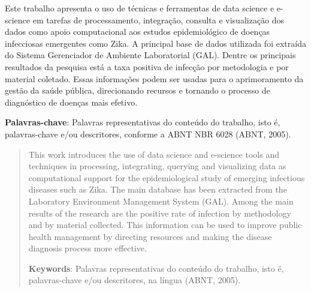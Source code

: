 \begin{resumo}

Este trabalho apresenta o uso de técnicas e ferramentas de data science e e-science em tarefas de processamento, integração, consulta e visualização dos dados como apoio computacional aos estudos epidemiológico de doenças infecciosas emergentes como Zika. A principal base de dados utilizada foi extraída do Sistema Gerenciador de Ambiente Laboratorial (GAL). Dentre os principais resultados da pesquisa está a taxa positiva de infecção por metodologia e por material coletado. Essas informações podem ser usadas para o aprimoramento da gestão da saúde pública, direcionando recursos e tornando o processo de diagnóstico de doenças mais efetivo.

{\hspace{-8mm} \bf{Palavras-chave}}: Palavras representativas do conteúdo do trabalho, isto é, palavras-chave e/ou descritores, conforme a ABNT NBR 6028 (ABNT, 2005).

\end{resumo}

\begin{abstract}

This work introduces the use of data science and e-science tools and techniques in processing, integrating, querying and visualizing data as computational support for the epidemiological study of emerging infectious diseases such as Zika. The main database has been extracted from the Laboratory Environment Management System (GAL). Among the main results of the research are the positive rate of infection by methodology and by material collected. This information can be used to improve public health management by directing resources and making the disease diagnosis process more effective.

{\hspace{-8mm} \bf{Keywords}}: Palavras representativas do conteúdo do trabalho, isto é, palavras-chave e/ou descritores, na língua (ABNT, 2005).

\end{abstract}

\listoffigures


